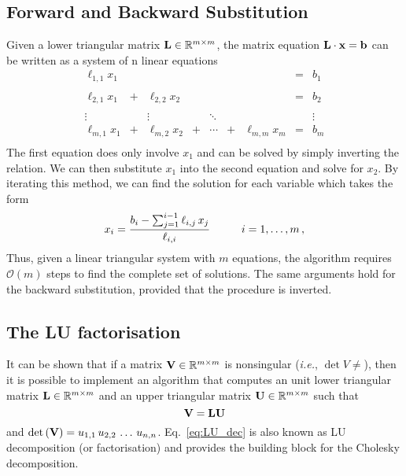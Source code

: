 \subsection*{Forward and Backward Substitution}
Given a lower triangular matrix $\mathbf{L} \in \mathbb{R}^{m \times m}$, the matrix equation $\mathbf{L} \cdot \mathbf{x} = \mathbf{b}$ can be written as a system of n linear equations
\begin{equation*}
\begin{matrix}
  \ell_{1,1} x_1 &   &                &   &        &   &                & = &    b_1 \\\\
  \ell_{2,1} x_1 & + & \ell_{2,2} x_2 &   &        &   &                & = &    b_2 \\\\
          \vdots &   &         \vdots &   & \ddots &   &                &   & \vdots \\
  \ell_{m,1} x_1 & + & \ell_{m,2} x_2 & + & \dotsb & + & \ell_{m,m} x_m & = &    b_m \\
\end{matrix}
\end{equation*}
The first equation does only involve $x_1$ and can be solved by simply inverting the relation. We can then substitute $x_1$ into the second equation and solve for $x_2$. By iterating this method, we can find the solution for each variable which takes the form
\begin{equation*}
    x_i = \frac{b_i - \sum_{j=1}^{i-1}\ell_{i,j}\,x_j}{\ell_{i,i}} \hspace{10mm} i=1, \dots, m\,,
\end{equation*}
Thus, given a linear triangular system with $m$ equations, the algorithm requires $\mathcal{O}(m)$ steps to find the complete set of solutions. The same arguments hold for the backward substitution, provided that the procedure is inverted.

\subsection*{The LU factorisation}
It can be shown that if a matrix $\mathbf{V} \in \mathbb{R}^{m\times m}$ is nonsingular (\textit{i.e.}, $\det V \neq$), then it is possible to implement an algorithm that computes an unit lower triangular matrix $\mathbf{L} \in \mathbb{R}^{m\times m}$ and an upper triangular matrix $\mathbf{U} \in  \mathbb{R}^{m\times m}$ such that 
\begin{equation*}
    \mathbf{V} = \mathbf{L} \mathbf{U} 
    \label{eq:LU_dec}
\end{equation*}
and $\det\left( \mathbf{V} \right) = u_{1,1} \, u_{2,2} \, \dots \, u_{n,n} $. Eq.~\eqref{eq:LU_dec} is also known as LU decomposition (or factorisation) and provides the building block for the Cholesky decomposition.

